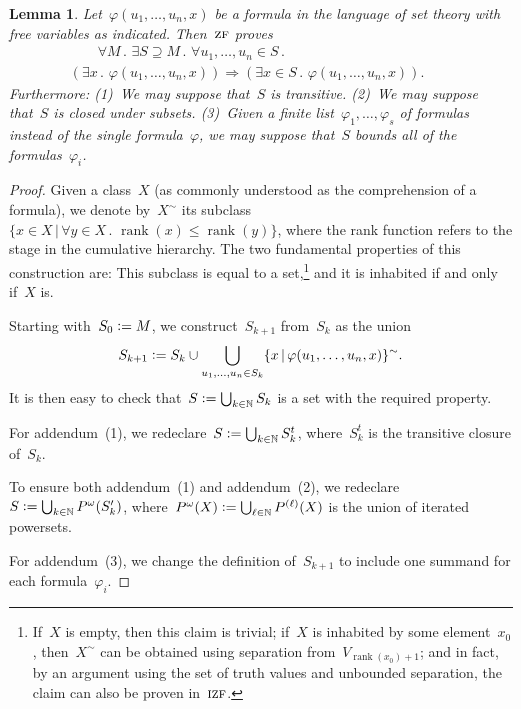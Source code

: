 \documentclass[oneside,reqno]{amsart}
\theoremstyle{definition}
\theoremstyle{plain}
\newtheorem{lemma}[defn]{Lemma}
\theoremstyle{remark}
\newcommand{\NN}{\mathbb{N}}
\newcommand{\defeq}{\vcentcolon=}
\DeclareMathOperator{\rank}{rank}
\renewcommand{\_}{\mathpunct{.}\,}
\newcommand{\?}{\,{:}\,}
\newcommand{\ZF}{\textsc{zf}}
\newcommand{\IZF}{\textsc{izf}}
\begin{document}
\begin{lemma}\label{lemma:zf-smallstep}
Let~$\varphi(u_1,\ldots,u_n,x)$ be a formula in the language of set
theory with free variables as indicated. Then~$\ZF$ proves
\begin{multline*}
  {\qquad}\forall M\_
  \exists S \supseteq M\_
  \forall u_1,\ldots,u_n \in S\_ \\
  (\exists x\_ \varphi(u_1,\ldots,u_n,x)) \Longrightarrow
  (\exists x \in S\_ \varphi(u_1,\ldots,u_n,x)).{\qquad}
\end{multline*}
Furthermore: (1)~We may suppose that~$S$ is transitive. (2)~We may suppose that~$S$ is
closed under subsets. (3)~Given a finite list~$\varphi_1,\ldots,\varphi_s$
of formulas instead of the single formula~$\varphi$, we may suppose that~$S$
bounds all of the formulas~$\varphi_i$.
\end{lemma}

\begin{proof}Given a class~$X$ (as commonly understood as the comprehension of
a formula), we denote by~$X^\sim$ its subclass~$\{ x \in X \,|\, \forall y
\in X\_ \rank(x) \leq \rank(y) \}$, where the rank function refers to the stage
in the cumulative hierarchy. The two fundamental properties of this construction are:
This subclass is equal to a set,\footnote{If~$X$ is empty, then
this claim is trivial; if~$X$ is inhabited by some element~$x_0$, then~$X^\sim$ can
be obtained using separation from~$V_{\rank(x_0)+1}$; and in fact, by an argument
using the set of truth values and unbounded separation, the claim can also be
proven in~$\IZF$.} and it is inhabited if and only if~$X$ is.

Starting with~$S_0 \defeq M$, we construct~$S_{k+1}$ from~$S_k$ as the union
\[ S_{k+1} \defeq S_k \cup \bigcup_{u_1,\ldots,u_n \in S_k} \{ x \,|\,
\varphi(u_1,\ldots,u_n,x) \}^\sim. \]
It is then easy to check that~$S \defeq \bigcup_{k \in \NN} S_k$ is a set with the
required property.

For addendum~(1), we redeclare~$S \defeq \bigcup_{k \in \NN} S_k^t$,
where~$S_k^t$ is the transitive closure of~$S_k$.

To ensure both addendum~(1) and addendum~(2), we redeclare~$S \defeq \bigcup_{k
\in \NN} P^\omega(S_k')$, where~$P^\omega(X) \defeq \bigcup_{\ell \in \NN}
P^{(\ell)}(X)$ is the union of iterated powersets.

For addendum~(3), we change the definition of~$S_{k+1}$ to include one summand
for each formula~$\varphi_i$.
\end{proof}
\end{document}
